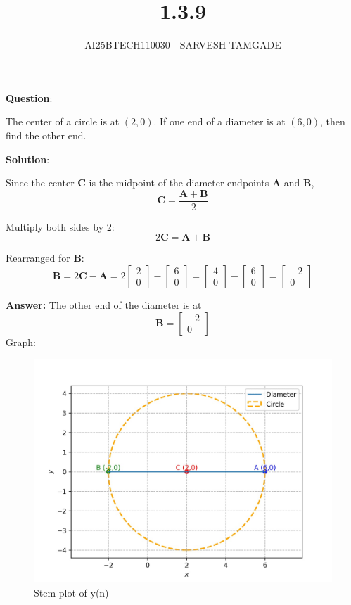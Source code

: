 \documentclass[journal,12pt,onecolumn]{IEEEtran}
\begin{document}
\title{1.3.9}
\author{AI25BTECH110030 - SARVESH TAMGADE}

{\let\newpage\relax\maketitle}


		\textbf{Question}:

The center of a circle is at $(2,0)$. If one end of a diameter is at $(6,0)$, then find the other end.

\textbf{Solution}:

Since the center $\mathbf{C}$ is the midpoint of the diameter endpoints $\mathbf{A}$ and $\mathbf{B}$,
\[
\mathbf{C} = \frac{\mathbf{A} + \mathbf{B}}{2}
\]

Multiply both sides by 2:
\[
2\mathbf{C} = \mathbf{A} + \mathbf{B}
\]

Rearranged for $\mathbf{B}$:
\[
\mathbf{B} = 2\mathbf{C} - \mathbf{A} = 2 \begin{bmatrix} 2 \\ 0 \end{bmatrix} - \begin{bmatrix} 6 \\ 0 \end{bmatrix} = \begin{bmatrix} 4 \\ 0 \end{bmatrix} - \begin{bmatrix} 6 \\ 0 \end{bmatrix} = \begin{bmatrix} -2 \\ 0 \end{bmatrix}
\]

\textbf{Answer:} The other end of the diameter is at
\[
\mathbf{B} = \begin{bmatrix} -2 \\ 0 \end{bmatrix}
\]
Graph:
\begin{figure}[H]
	\centering
	\includegraphics[width=0.8\columnwidth]{FIG/graph.png}
	\caption{Stem plot  of y(n)}
	\label{img}
\end{figure}
\end{document}
